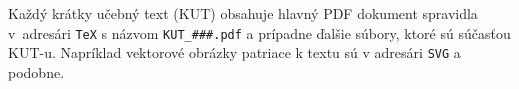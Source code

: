 \documentclass[a4paper, 11pt, ]{article}
\begin{document}
Každý krátky učebný text (KUT) obsahuje hlavný PDF dokument spravidla v~adresári \verb|TeX| s názvom \verb|KUT_###.pdf| a prípadne ďalšie súbory, ktoré sú súčasťou KUT-u. Napríklad vektorové obrázky patriace k textu sú v adresári \verb|SVG| a podobne.






\end{document}
